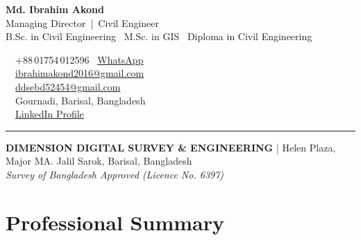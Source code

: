 \documentclass[10.5pt, a4paper]{article}
\begin{document}
\noindent
\begin{minipage}[t]{0.58\linewidth}
  \vspace{0pt}
  {\fontsize{24}{28}\selectfont\bfseries\color{ddseNavy} Md. Ibrahim Akond}\\[3pt]
  {\normalsize\color{ddseBlue} Managing Director \,|\, Civil Engineer}\\[4pt]
  {\color{ddseMid}\footnotesize
    B.Sc. in Civil Engineering \textbullet\
    M.Sc. in GIS \textbullet\
    Diploma in Civil Engineering
  }
\end{minipage}%
\hfill
\begin{minipage}[t]{0.40\linewidth}
  \vspace{0pt}
  \raggedleft
  {\color{ddseMid}\footnotesize
    \faPhone\ \ +88\,01754\,012596 \quad \faWhatsapp\ \href{https://wa.me/8801754012596}{WhatsApp}\\[2pt]
    \faEnvelope\ \ \href{mailto:ibrahimakond2016@gmail.com}{ibrahimakond2016@gmail.com}\\[2pt]
    \faEnvelope\ \ \href{mailto:ddsebd52454@gmail.com}{ddsebd52454@gmail.com}\\[2pt]
    \faMapMarkerAlt\ \ Gournadi, Barisal, Bangladesh\\[2pt]
    \faLinkedin\ \ \href{https://www.linkedin.com/}{LinkedIn Profile}
  }
\end{minipage}

\vspace{4pt}
{\color{ddseAmber}\rule{\linewidth}{2pt}}

\vspace{1pt}
\noindent
\colorbox{ddseNavy!6}{%
  \begin{minipage}{\dimexpr\linewidth-2\fboxsep}
    \vspace{2pt}
    \centering
    {\footnotesize\color{ddseNavy}
      \textbf{DIMENSION DIGITAL SURVEY \& ENGINEERING} \quad|\quad
      Helen Plaza, Major MA. Jalil Sarok, Barisal, Bangladesh \\
      \textit{Survey of Bangladesh Approved (Licence No. 6397)}
    }
    \vspace{2pt}
  \end{minipage}%
}

\vspace{4pt}

\section{Professional Summary}
\end{document}
